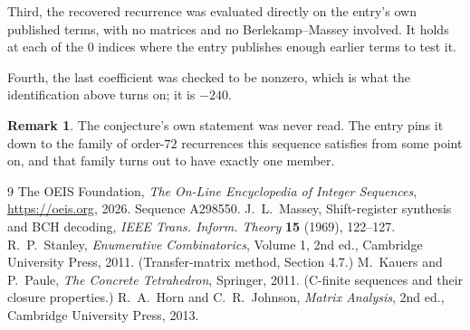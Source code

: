 \documentclass[11pt,a4paper]{article}
\theoremstyle{plain}
\theoremstyle{definition}
\newtheorem{remark}[theorem]{Remark}
\begin{document}
Third, the recovered recurrence was evaluated directly on the entry's own published terms, with
no matrices and no Berlekamp--Massey involved. It holds at each of the $0$ indices where
the entry publishes enough earlier terms to test it.

Fourth, the last coefficient was checked to be nonzero, which is what the identification above
turns on; it is $-240$.

\begin{remark}
The conjecture's own statement was never read. The entry pins it down to the family of
order-$72$ recurrences this sequence satisfies from some point on, and that family turns
out to have exactly one member.
\end{remark}

\begin{thebibliography}{9}
 The OEIS Foundation, \emph{The On-Line Encyclopedia of Integer
Sequences}, \url{https://oeis.org}, 2026. Sequence A298550.
 J.~L.~Massey, Shift-register synthesis and BCH decoding, \emph{IEEE
Trans. Inform. Theory} \textbf{15} (1969), 122--127.
 R.~P.~Stanley, \emph{Enumerative Combinatorics}, Volume 1, 2nd ed.,
Cambridge University Press, 2011. (Transfer-matrix method, Section 4.7.)
 M.~Kauers and P.~Paule, \emph{The Concrete Tetrahedron}, Springer, 2011.
(C-finite sequences and their closure properties.)
 R.~A.~Horn and C.~R.~Johnson, \emph{Matrix Analysis}, 2nd ed., Cambridge
University Press, 2013.
\end{thebibliography}
\end{document}
